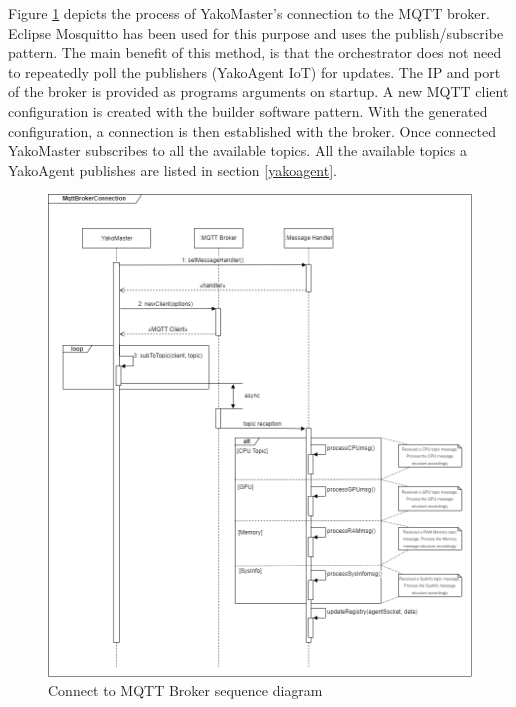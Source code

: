            Figure \ref{fig:mqtt_broker_connection_sd} depicts the process of YakoMaster's connection to the MQTT broker. 
            Eclipse Mosquitto \cite{eclipse_eclipse_2018} has been used for this purpose and uses the publish/subscribe pattern. The main benefit of this method, is that the orchestrator does not need to repeatedly poll the publishers (YakoAgent IoT) for updates.
            The IP and port of the broker is provided as programs arguments on startup. A new MQTT client configuration is created with the builder software pattern. With the generated configuration, a connection is then established with the broker. Once connected YakoMaster subscribes to all the available topics. All the available topics a YakoAgent publishes are listed in section \ref{yakoagent}. 
        
            \begin{figure}[H]
                \centering
                \includegraphics[width=0.95\linewidth]{Images/Backend/MQTT Connection SD.png}
                \caption{Connect to MQTT Broker sequence diagram}
                \label{fig:mqtt_broker_connection_sd}
            \end{figure}
            

